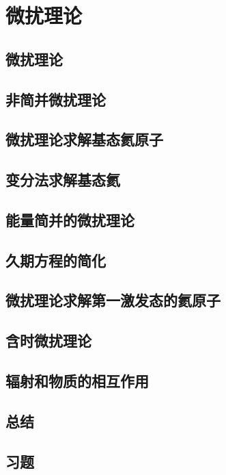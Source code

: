 \chapter{微扰理论}
\label{chap:9}
\section{微扰理论}
\label{sec:9.1 Perturbation Theory}

\section{非简并微扰理论}
\label{sec:9.2 Nondegenerate Perturbation Theory}

\section{微扰理论求解基态氦原子}
\label{sec:9.3 Perturbation Treatment of the Helium-Atom Ground State}

\section{变分法求解基态氦}
\label{sec:9.4 Variational Treatments of the Ground State of Helium}

\section{能量简并的微扰理论}
\label{sec:9.5 Perturbation Theory for a Degenerate Energy Level}

\section{久期方程的简化}
\label{sec:9.6 Simplification of the Duration Equation}

\section{微扰理论求解第一激发态的氦原子}
\label{sec:9.7 Perturbation Treatment of the First Excited State of Helium}

\section{含时微扰理论}
\label{sec:9.8 Time-dependent Perturbation Theory}

\section{辐射和物质的相互作用}
\label{sec:9.9 Interaction of Radiation and Matter}

\section*{总结}

\section*{习题}